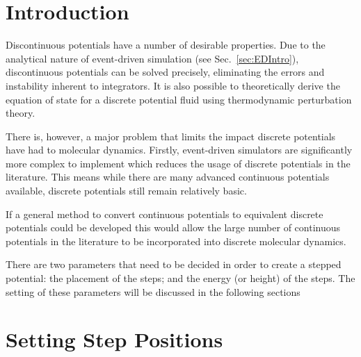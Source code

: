 \documentclass[12pt]{UoAthesis} \usepackage{booktabs}
\begin{document}
\section{Introduction}
Discontinuous potentials have a number of desirable properties.  Due
to the analytical nature of event-driven simulation (see
Sec.~\ref{sec:EDIntro}), discontinuous potentials can be solved
precisely, eliminating the errors and instability inherent to
integrators. It is also possible to theoretically derive the equation
of state for a discrete potential fluid using thermodynamic
perturbation theory.

There is, however, a major problem that limits the impact discrete
potentials have had to molecular dynamics.  Firstly, event-driven
simulators are significantly more complex to implement which reduces
the usage of discrete potentials in the literature.  This means while
there are many advanced continuous potentials available, discrete
potentials still remain relatively basic.

If a general method to convert continuous potentials to equivalent
discrete potentials could be developed this would allow the large
number of continuous potentials in the literature to be incorporated
into discrete molecular dynamics.

There are two parameters that need to be decided in order to create a
stepped potential: the placement of the steps; and the energy (or
height) of the steps.  The setting of these parameters will be
discussed in the following sections

\section{Setting Step Positions}
\end{document}
